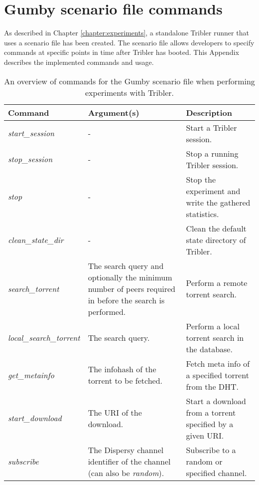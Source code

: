 \chapter{Gumby scenario file commands}
\label{appendix:gumby-scenario-commands}
As described in Chapter \ref{chapter:experiments}, a standalone Tribler runner that uses a scenario file has been created. The scenario file allows developers to specify commands at specific points in time after Tribler has booted. This Appendix describes the implemented commands and usage.

\begin{table}[h!]
	\begin{tabularx}{\textwidth}{|X|X|X|}
		\hline
		\textbf{Command} & \textbf{Argument(s)} & \textbf{Description}\\ \hline
		\emph{start\_session} & - & Start a Tribler session.\\ \hline
		\emph{stop\_session} & - & Stop a running Tribler session.\\ \hline
		\emph{stop} & - & Stop the experiment and write the gathered statistics.\\ \hline
		\emph{clean\_state\_dir} & - & Clean the default state directory of Tribler.\\ \hline
		\emph{search\_torrent} & The search query and optionally the minimum number of peers required in before the search is performed. & Perform a remote torrent search.\\ \hline
		\emph{local\_search\_torrent} & The search query. & Perform a local torrent search in the database.\\ \hline
		\emph{get\_metainfo} & The infohash of the torrent to be fetched. & Fetch meta info of a specified torrent from the DHT.\\ \hline
		\emph{start\_download} & The URI of the download. & Start a download from a torrent specified by a given URI.\\ \hline
		\emph{subscribe} & The Dispersy channel identifier of the channel (can also be \emph{random}). & Subscribe to a random or specified channel.\\ \hline
	\end{tabularx}
	\caption{An overview of commands for the Gumby scenario file when performing experiments with Tribler.}
	\label{table:gumby-scenario-file}
\end{table}